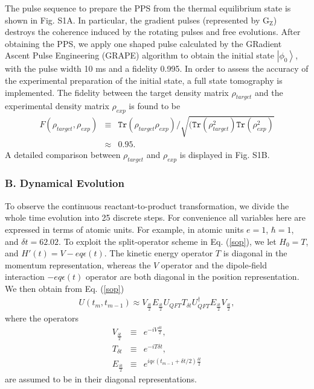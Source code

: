 \documentclass[twocolumn,showpacs,twoside,10pt,prl]{revtex4}
\begin{document}
 The pulse sequence to prepare the PPS from the thermal equilibrium state is shown in Fig. S1A. In particular,
 the gradient pulses (represented by G$_\text{Z}$) destroys the coherence induced by the rotating pulses and free evolutions. After obtaining the PPS,
 we apply one shaped pulse calculated by the GRadient Ascent Pulse Engineering (GRAPE) algorithm \cite{grape1-2,grape2-2,grape3-2} to obtain the initial state $\left\vert \phi_{0} \right\rangle$, with the pulse width 10 ms and a fidelity 0.995. In order to assess the accuracy of the experimental preparation of the initial state, a full state tomography \cite{tomography} is implemented. The fidelity \cite{fidelity} between the target density matrix $\rho_{target}$ and the experimental density matrix $\rho_{exp}$ is found to be
\begin{eqnarray}\label{pps}
F(\rho_{target}, \rho_{exp})&\equiv& \texttt{Tr}(\rho_{target}\rho_{exp})/\sqrt{(\texttt{Tr}(\rho_{target}^2)\texttt{Tr}(\rho_{exp}^2)} \nonumber \\
&\approx & 0.95.
\end{eqnarray}
A detailed comparison between $\rho_{target}$ and $\rho_{exp}$ is displayed in Fig. S1B.

\subsubsection*{\textbf{B. Dynamical Evolution}}

To observe the continuous reactant-to-product transformation, we divide the whole time evolution into 25 discrete steps. For convenience
all variables here are expressed in terms of atomic units.  For example, in atomic units $e=1$, $\hbar=1$, and $\delta t  = 62.02$.
  To exploit the split-operator scheme in Eq. (\ref{sop}), we let $H_0=T$, and $H'(t)=V-eq\epsilon(t)$.  The kinetic energy operator $T$ is diagonal in the momentum representation, whereas the $V$ operator and the dipole-field interaction $-eq\epsilon(t)$ operator are both diagonal in the position representation.  We then obtain from Eq. (\ref{sop})
\begin{eqnarray}
 U(t_m,t_{m-1})\approx  V_{\frac{\delta t}{2}}E_{\frac{\delta t}{2}}U_{QFT}T_{\delta t}U_{QFT}^{\dagger}E_{\frac{\delta t}{2}}V_{\frac{\delta t}{2}},
 \end{eqnarray}
where the operators
\begin{eqnarray}\label{potential}
V_{\frac{\delta t}{2}} &\equiv &e^{-i {V}\frac{\delta t}{2}},\\
T_{\delta t} &\equiv &e^{-i  {T}\delta t},\\
E_{\frac{\delta t}{2}} &\equiv&e^{i {q}\varepsilon(t_{m-1}+\delta t/2)\frac{\delta t}{2}}
\end{eqnarray}
are assumed to be in their diagonal representations.
\end{document}
